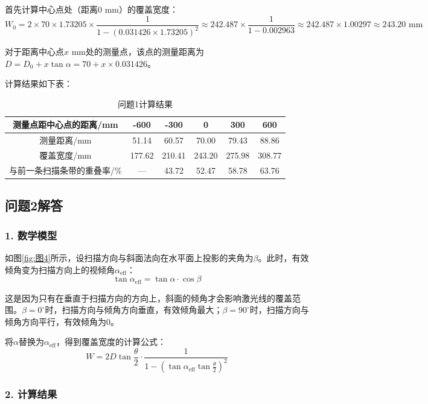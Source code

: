 \documentclass{article}
\begin{document}
	首先计算中心点处（距离0 mm）的覆盖宽度：
	\[
	W_0 = 2 \times 70 \times 1.73205 \times \frac{1}{1 - (0.031426 \times 1.73205)^2} \approx 242.487 \times \frac{1}{1 - 0.002963} \approx 242.487 \times 1.00297 \approx 243.20 \text{ mm}
	\]
	
	对于距离中心点\(x\) mm处的测量点，该点的测量距离为\(D = D_0 + x \tan \alpha = 70 + x \times 0.031426\)。
	
	计算结果如下表：
	
	\begin{table}[h!]
		\centering
		\caption{问题1计算结果}
		\begin{tabular}{cccccc}
			\toprule
			测量点距中心点的距离/mm & -600 & -300 & 0 & 300 & 600 \\
			\midrule
			测量距离/mm & 51.14 & 60.57 & 70.00 & 79.43 & 88.86 \\
			覆盖宽度/mm & 177.62 & 210.41 & 243.20 & 275.98 & 308.77 \\
			与前一条扫描条带的重叠率/\% & — & 43.72 & 52.47 & 58.78 & 63.76 \\
			\bottomrule
		\end{tabular}
	\end{table}
	
	\subsection*{问题2解答}
	
	\subsubsection*{1. 数学模型}
	
	如图\ref{fig:图4}所示，设扫描方向与斜面法向在水平面上投影的夹角为\(\beta\)。此时，有效倾角变为扫描方向上的视倾角\(\alpha_{\text{eff}}\)：
	\[
	\tan \alpha_{\text{eff}} = \tan \alpha \cdot \cos \beta
	\]
	
	这是因为只有在垂直于扫描方向的方向上，斜面的倾角才会影响激光线的覆盖范围。\(\beta=0^\circ\)时，扫描方向与倾角方向垂直，有效倾角最大；\(\beta=90^\circ\)时，扫描方向与倾角方向平行，有效倾角为0。
	
	将\(\alpha\)替换为\(\alpha_{\text{eff}}\)，得到覆盖宽度的计算公式：
	\[
	W = 2D \tan\frac{\theta}{2} \cdot \frac{1}{1 - \left( \tan \alpha_{\text{eff}} \tan\frac{\theta}{2} \right)^2}
	\]
	
	\subsubsection*{2. 计算结果}
	
\end{document}

